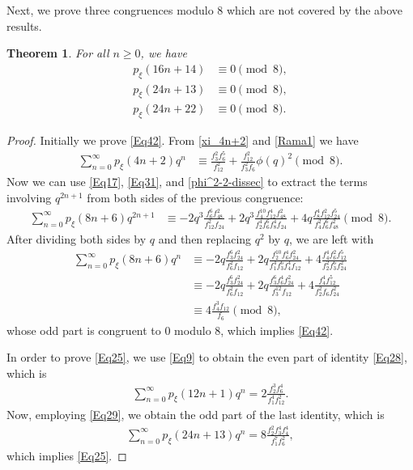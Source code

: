 \documentclass[12pt]{article}
\newtheorem{theorem}{Theorem}[section]
\begin{document}
Next, we prove three congruences modulo 8 which are not covered by the above results.  
\begin{theorem} For all $n \geq 0$, we have
\begin{align}
p_{\xi}(16n+14) & \equiv 0 \pmod{8}, \label{Eq42} \\
p_{\xi}(24n+13) & \equiv 0 \pmod{8}, \label{Eq25} \\
p_{\xi}(24n+22) & \equiv 0 \pmod{8}.  \label{Eq26}
\end{align}
\end{theorem}

\begin{proof} Initially we prove \eqref{Eq42}. From \eqref{xi_4n+2} and \eqref{Rama1} we have
\begin{align*}
\sum_{n=0}^{\infty} p_{\xi}(4n+2)q^n & \equiv \frac{f_{3}^2f_6^5}{f_{12}^2} +\frac{f_{12}^2}{f_{3}^2f_{6}} \phi(q)^2 \pmod{8}.
\end{align*}
Now we can use \eqref{Eq17}, \eqref{Eq31}, and \eqref{phi^2-2-dissec} to extract the terms involving $q^{2n+1}$ from both sides of the previous congruence:
\begin{align*}
\sum_{n=0}^{\infty} p_{\xi}(8n+6)q^{2n+1} & \equiv -2q^3\frac{f_{6}^6f_{48}^2}{f_{12}^2f_{24}} +2q^3\frac{f_4^{10}f_{12}^4f_{48}^2}{f_{2}^4f_{6}^6f_8^4f_{24}} +4q\frac{f_{8}^4f_{12}^2f_{24}^5}{f_{4}^2f_6^6f_{48}^2} \pmod{8}.
\end{align*}
After dividing both sides by $q$ and then replacing $q^2$ by $q$, we are left with
\begin{align*}
\sum_{n=0}^{\infty} p_{\xi}(8n+6)q^{n} & \equiv -2q\frac{f_{3}^6f_{24}^2}{f_{6}^2f_{12}} +2q\frac{f_2^{10}f_{6}^4f_{24}^2}{f_{1}^4f_{3}^6f_4^4f_{12}} +4\frac{f_{4}^4f_{6}^2f_{12}^5}{f_{2}^2f_3^6f_{24}^2} \\ 
& \equiv -2q\frac{f_{3}^6f_{24}^2}{f_{6}^2f_{12}} +2q\frac{f_3^{6}f_{6}^4f_{24}^2}{f_{3}^{12}f_{12}} +4\frac{f_{4}^4f_{12}^5}{f_{2}^2f_6f_{24}^2} \\ & \equiv 4\frac{f_{4}^3f_{12}}{f_6} \pmod{8},
\end{align*}
whose odd part is congruent to 0 modulo $8$, which implies \eqref{Eq42}.
	
In order to prove \eqref{Eq25}, we use \eqref{Eq9} to obtain the even part of identity \eqref{Eq28}, which is
\begin{align*}
\sum_{n=0}^{\infty} p_{\xi}(12n+1)q^{n} = 2\frac{f_{2}^3f_6^4}{f_1^4f_{12}^2}.
\end{align*}
Now, employing \eqref{Eq29}, we obtain the odd part of the last identity, which is
\begin{align*}
\sum_{n=0}^{\infty} p_{\xi}(24n+13)q^{n} = 8\frac{f_{2}^2f_3^4f_4^4}{f_1^7f_{6}^2},
\end{align*}
which implies \eqref{Eq25}.


\end{proof}
\end{document}
